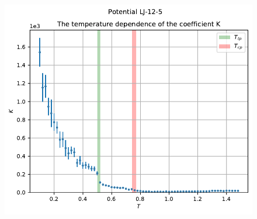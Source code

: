 \documentclass[pdf,hyperref={unicode}]{beamer}
\begin{document}
\begin{frame}
\begin{columns}
\begin{column}{0.6\linewidth}
{\begin{figure}[h]
\begin{center}
\begin{minipage}[h]{0.45\linewidth}
\includegraphics[width=\textwidth, keepaspectratio]{plot_K_Potential LJ-12-5_1}
\end{minipage}


\end{center}
\end{figure}}
\end{column}
\end{columns}
\end{frame}
\end{document}

